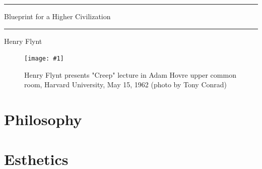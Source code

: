 \documentclass[10pt,twoside,draft]{memoir}
\begin{document}
\frontmatter
\graphicspath{{img/}}
\pagestyle{ruled}
\openany

\renewcommand*{\cftpartfont}{\bfseries\scshape}
\renewcommand*{\cftchapterfont}{\normalfont}
\renewcommand*{\cftsectionfont}{\itshape}
\renewcommand*{\chapterheadstart}{\vskip 1pt}



\thispagestyle{empty}
{
	\centering\sffamily

	\plainbreak{3}

	{ \Large
	Blueprint for a Higher Civilization \par}

	\plainbreak{3}

	{ \large Henry Flynt \par}
}

\clearpage

\newcommand{\photopage}[3]{
	\begin{figure}[!hp]
		\centering
		\texttt{[image: \#1]}
		\caption{#2 (photo by #3)}
	\end{figure}}

\photopage{img/creep}{Henry Flynt presents "Creep" lecture in Adam Hovre upper common room, Harvard University, May 15, 1962}{Tony Conrad}



\clearpage

\tableofcontents*

\clearpage

\mainmatter
\part{Philosophy}







\part{Esthetics}
% 



% 
% 
% 
\end{document}
